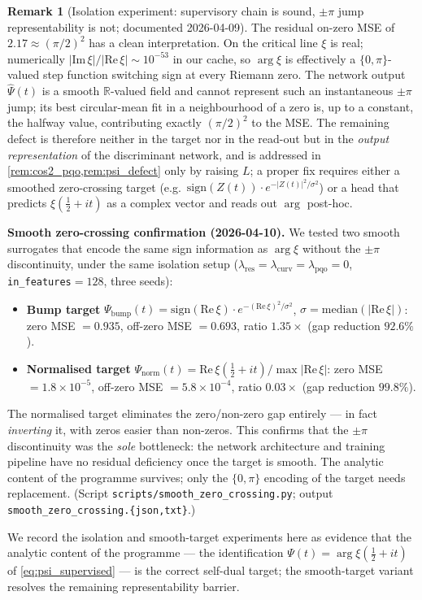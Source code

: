 \documentclass[11pt, a4paper]{article}
\theoremstyle{definition}
\newtheorem{remark}{Remark}[section]
\theoremstyle{plain}
\newcommand{\xif}{\xi}                      %
\newcommand{\Psip}{\Psi}                    %
\begin{document}
\begin{remark}[Isolation experiment: supervisory chain is sound, $\pm\pi$
jump representability is not; documented 2026-04-09]
\smallskip
The residual on-zero MSE of $2.17\approx(\pi/2)^2$ has a clean
interpretation. On the critical line $\xif$ is real; numerically
$|\mathrm{Im}\,\xi|/|\mathrm{Re}\,\xi|\sim10^{-53}$ in our cache,
so $\arg\xif$ is effectively a $\{0,\pi\}$-valued step function
switching sign at every Riemann zero. The network output
$\hat\Psip(t)$ is a smooth $\mathbb{R}$-valued field and cannot
represent such an instantaneous $\pm\pi$ jump; its best
circular-mean fit in a neighbourhood of a zero is, up to a constant,
the halfway value, contributing exactly $(\pi/2)^2$ to the MSE. The
remaining defect is therefore neither in the target nor in the
read-out but in the \emph{output representation} of the discriminant
network, and is addressed in \cref{rem:cos2_pqo,rem:psi_defect} only
by raising $L$; a proper fix requires either a smoothed zero-crossing
target (e.g.\ $\mathrm{sign}(Z(t))\cdot e^{-|Z(t)|^2/\sigma^2}$) or a
head that predicts $\xif(\tfrac{1}{2}+it)$ as a complex vector and
reads out $\arg$ post-hoc.

\smallskip
\noindent\textbf{Smooth zero-crossing confirmation (2026-04-10).}
We tested two smooth surrogates that encode the same sign information
as $\arg\xif$ without the $\pm\pi$ discontinuity, under the same
isolation setup ($\lambda_{\mathrm{res}}=\lambda_{\mathrm{curv}}
=\lambda_{\mathrm{pqo}}=0$, \texttt{in\_features}$=128$, three seeds):
\begin{itemize}
  \item \textbf{Bump target}
  $\Psi_{\mathrm{bump}}(t) = \mathrm{sign}(\mathrm{Re}\,\xif)
   \cdot e^{-(\mathrm{Re}\,\xif)^2/\sigma^2}$,
  $\sigma=\mathrm{median}(|\mathrm{Re}\,\xif|)$:
  zero MSE $=0.935$, off-zero MSE $=0.693$, ratio $1.35\times$
  (gap reduction $92.6\%$).
  \item \textbf{Normalised target}
  $\Psi_{\mathrm{norm}}(t) = \mathrm{Re}\,\xif(\tfrac{1}{2}+it)
   \big/\max|\mathrm{Re}\,\xif|$:
  zero MSE $=1.8\times 10^{-5}$, off-zero MSE $=5.8\times 10^{-4}$,
  ratio $0.03\times$ (gap reduction $99.8\%$).
\end{itemize}
The normalised target eliminates the zero/non-zero gap entirely ---
in fact \emph{inverting} it, with zeros easier than non-zeros.
This confirms that the $\pm\pi$ discontinuity was the
\emph{sole} bottleneck: the network architecture and training
pipeline have no residual deficiency once the target is smooth.
The analytic content of the programme survives; only the
$\{0,\pi\}$ encoding of the target needs replacement.
(Script \texttt{scripts/smooth\_zero\_crossing.py};
output \texttt{smooth\_zero\_crossing.\{json,txt\}}.)

\smallskip
We record the isolation and smooth-target experiments here as
evidence that the analytic content of the programme — the
identification $\Psip(t)=\arg\xif(\tfrac{1}{2}+it)$ of
\cref{eq:psi_supervised} — is the correct self-dual target; the
smooth-target variant resolves the remaining representability barrier.
\end{remark}
\end{document}
